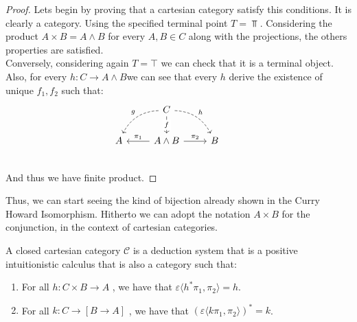\begin{proof}

  Lets begin by proving that a cartesian category satisfy this conditions. It is clearly a category. Using the specified terminal point $T=\Top$.  Considering the product $A\times B = A\land B$ for every $A,B \in C$ along with the projections, the others properties are satisfied.\\

  Conversely, considering again $T= \top$ we can check that it is a terminal object. Also, for every $h:C\to A\land B$we can see that every $h$ derive the existence of unique $f_1,f_2$ such that:
  \[
    \begin{tikzcd}
      {} & C \arrow[bend right,swap,dashed]{dl}{g}
      \arrow[bend left,dashed]{dr}{h} \arrow{d}[description]{f}& & \\
      A  &A\land B \arrow{l}[swap]{\pi_1} \arrow{r}{\pi_2} & 
      B \\
    \end{tikzcd}
  \]
  And thus we have finite product.
\end{proof}

Thus, we can start seeing the kind of bijection already shown in the Curry Howard Isomorphism. Hitherto we can adopt the notation $A\times B$ for the conjunction, in the context of cartesian categories.
\begin{proposition}\label{def2:CCC}
  A closed cartesian category $\mathcal{C}$ is a deduction system that is a positive intuitionistic calculus that is also a category such that:
  \begin{enumerate}
  \item   For all $h: C\times B \to A$ , we have that $\varepsilon \langle h^* \pi_1, \pi_2\rangle = h$.
  \item   For all $k: C\to [B \to A]$ , we have that $(\varepsilon \langle k \pi_1, \pi_2\rangle)^* = k$.
  \end{enumerate}
\end{proposition}

